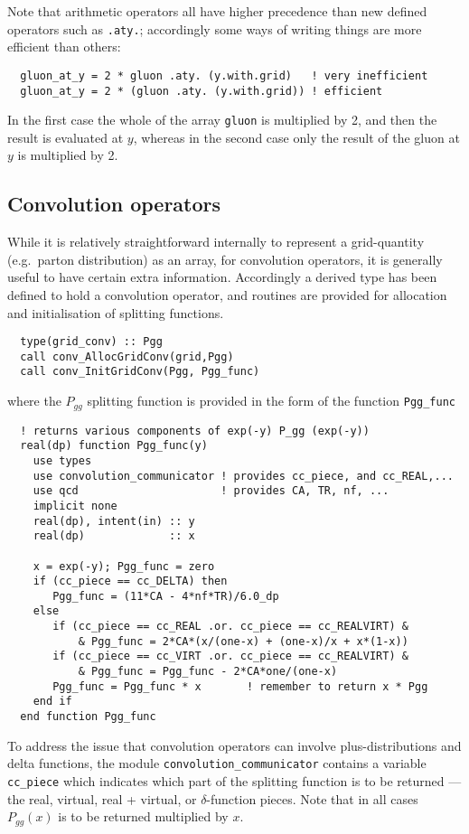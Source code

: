 \documentclass[12pt]{article}
\begin{document}
Note that arithmetic operators all have higher precedence than new
defined operators such as \texttt{.aty.}; accordingly some ways of
writing things are more efficient than others:
\begin{verbatim}
  gluon_at_y = 2 * gluon .aty. (y.with.grid)   ! very inefficient
  gluon_at_y = 2 * (gluon .aty. (y.with.grid)) ! efficient
\end{verbatim}
In the first case the whole of the array \texttt{gluon} is multiplied
by 2, and then the result is evaluated at $y$, whereas in the second
case only the result of the gluon at $y$ is multiplied by 2.

\subsection{Convolution operators}
\label{sec:conv}

While it is relatively straightforward internally to represent a
grid-quantity (e.g.\ parton distribution) as an array, for convolution
operators, it is generally useful to have certain extra
information. Accordingly a derived type has been defined to hold a
convolution operator, and routines are provided for allocation and
initialisation of splitting functions.
\begin{verbatim}
  type(grid_conv) :: Pgg
  call conv_AllocGridConv(grid,Pgg)
  call conv_InitGridConv(Pgg, Pgg_func)
\end{verbatim}
where the $P_{gg}$ splitting function is provided in the form of the
function \texttt{Pgg\_func}
\begin{verbatim}
  ! returns various components of exp(-y) P_gg (exp(-y))
  real(dp) function Pgg_func(y)
    use types
    use convolution_communicator ! provides cc_piece, and cc_REAL,...
    use qcd                      ! provides CA, TR, nf, ...
    implicit none
    real(dp), intent(in) :: y
    real(dp)             :: x

    x = exp(-y); Pgg_func = zero
    if (cc_piece == cc_DELTA) then 
       Pgg_func = (11*CA - 4*nf*TR)/6.0_dp
    else
       if (cc_piece == cc_REAL .or. cc_piece == cc_REALVIRT) & 
           & Pgg_func = 2*CA*(x/(one-x) + (one-x)/x + x*(1-x))
       if (cc_piece == cc_VIRT .or. cc_piece == cc_REALVIRT) & 
           & Pgg_func = Pgg_func - 2*CA*one/(one-x)
       Pgg_func = Pgg_func * x       ! remember to return x * Pgg
    end if
  end function Pgg_func
\end{verbatim}
To address the issue that convolution operators can involve
plus-distributions and delta functions, the module
\texttt{convolution\_communicator} contains a variable
\texttt{cc\_piece} which indicates which part of the splitting
function is to be returned --- the real, virtual, real + virtual, or
$\delta$-function pieces. Note that in all cases $P_{gg}(x)$ is to be
returned multiplied by $x$.
\end{document}
